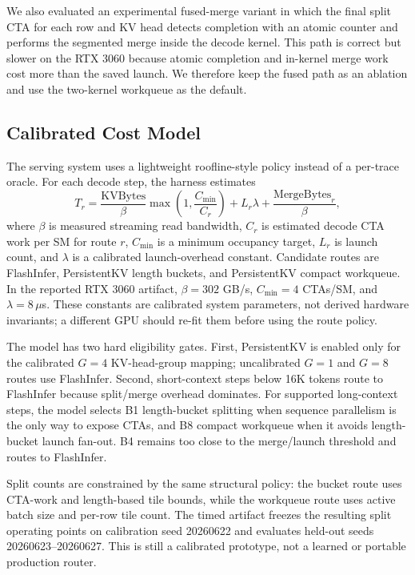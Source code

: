 \documentclass[10pt]{article}
\begin{document}
We also evaluated an experimental fused-merge variant in which the final split
CTA for each row and KV head detects completion with an atomic counter and
performs the segmented merge inside the decode kernel. This path is correct but
slower on the RTX 3060 because atomic completion and in-kernel merge work cost
more than the saved launch. We therefore keep the fused path as an ablation and
use the two-kernel workqueue as the default.

\subsection{Calibrated Cost Model}

The serving system uses a lightweight roofline-style policy instead of a
per-trace oracle. For each decode step, the harness estimates
\[
T_r =
\frac{\mathrm{KVBytes}}{\beta}
\max\left(1, \frac{C_{\min}}{C_r}\right)
+ L_r\lambda +
\frac{\mathrm{MergeBytes}_r}{\beta},
\]
where $\beta$ is measured streaming read bandwidth, $C_r$ is estimated decode
CTA work per SM for route $r$, $C_{\min}$ is a minimum occupancy target,
$L_r$ is launch count, and $\lambda$ is a calibrated launch-overhead constant.
Candidate routes are FlashInfer, PersistentKV length buckets, and PersistentKV
compact workqueue. In the reported RTX 3060 artifact, $\beta=302$ GB/s,
$C_{\min}=4$ CTAs/SM, and $\lambda=8\,\mu$s. These constants are calibrated
system parameters, not derived hardware invariants; a different GPU should
re-fit them before using the route policy.

The model has two hard eligibility gates. First, PersistentKV is enabled only
for the calibrated $G=4$ KV-head-group mapping; uncalibrated $G=1$ and $G=8$
routes use FlashInfer. Second, short-context steps below 16K tokens route to
FlashInfer because split/merge overhead dominates. For supported long-context
steps, the model selects B1 length-bucket splitting when sequence parallelism
is the only way to expose CTAs, and B8 compact workqueue when it avoids
length-bucket launch fan-out. B4 remains too close to the merge/launch
threshold and routes to FlashInfer.

Split counts are constrained by the same structural policy: the bucket route
uses CTA-work and length-based tile bounds, while the workqueue route uses
active batch size and per-row tile count. The timed artifact freezes the
resulting split operating points on calibration seed 20260622 and evaluates
held-out seeds 20260623--20260627. This is still a calibrated prototype, not a
learned or portable production router.
\end{document}
